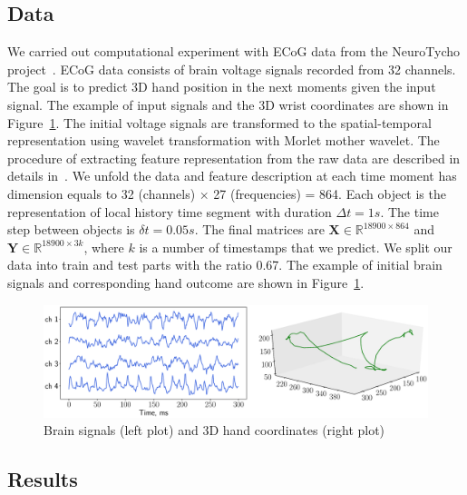 \documentclass[12pt,twoside]{article}
\theoremstyle{definition}
\newcommand{\bY}{\mathbf{Y}}
\newcommand{\bX}{\mathbf{X}}
\newcommand{\bbR}{\mathbb{R}}
\begin{document}
\subsection{Data}

We carried out computational experiment with ECoG data from the NeuroTycho project~\cite{shimoda2012decoding}.
ECoG data consists of brain voltage signals recorded from 32 channels.
The goal is to predict 3D hand position in the next moments given the input signal.
The example of input signals and the 3D wrist coordinates are shown in Figure~\ref{fig:ecog_data}.
The initial voltage signals are transformed to the spatial-temporal representation using wavelet transformation with Morlet mother wavelet.
The procedure of extracting feature representation from the raw data are described in details in~\cite{chao2010long,eliseyev2016penalized}.
We unfold the data and feature description at each time moment has dimension equals to 32 (channels) $\times$ 27 (frequencies) = 864.
Each object is the representation of local history time segment with duration $\Delta t = 1s$. The time step between objects is $\delta t =  0.05s$.
The final matrices are $\bX \in \bbR^{18900 \times 864}$ and $\bY \in \bbR^{18900 \times 3k}$, where $k$ is a number of timestamps that we predict.
We split our data into train and test parts with the ratio 0.67. 
The example of initial brain signals and corresponding hand outcome are shown in Figure~\ref{fig:ecog_data}.

\begin{figure}
	\centering
	\includegraphics[width=\linewidth]{figs/ecog_data}
	\caption{Brain signals (left plot) and 3D hand coordinates (right plot)}
	\label{fig:ecog_data}
\end{figure}

\subsection{Results}
\end{document}
